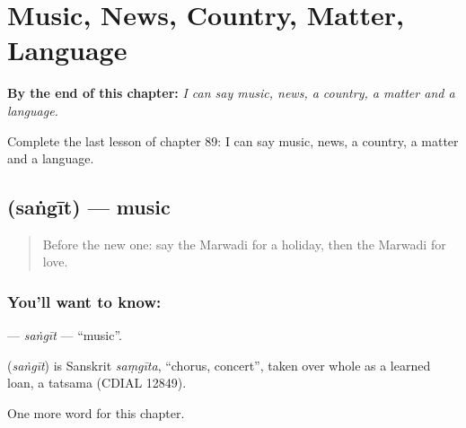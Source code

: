 
\chapter{Music, News, Country, Matter, Language}
\label{ch:mw-music-news-country-matter-language}

\begin{chapteropening}
\textbf{By the end of this chapter:} \emph{I can say music, news, a country, a matter and a language.}

Complete the last lesson of chapter 89: I can say music, news, a country, a matter and a language.
\end{chapteropening}

\section[\texorpdfstring{\mw{संगीत} (saṅgīt)}{संगीत (saṅgīt)}]{ (saṅgīt) — music}

\label{lesson:MW-C89-sangit}



\begin{quote}
Before the new one: say the Marwadi for a holiday, then the Marwadi for love.
\end{quote}

\subsection*{You'll want to know: }
\textbf{} — \emph{saṅgīt} — \textquotedblleft{}music\textquotedblright{}.

\begin{cousinweb}
\textbf{} (\emph{saṅgīt}) is Sanskrit \emph{saṃgīta}, \textquotedblleft{}chorus, concert\textquotedblright{}, taken over whole as a learned loan, a tatsama (CDIAL 12849).
\end{cousinweb}

\begin{grammarlens}[title={What you've built}]
One more word for this chapter.
\end{grammarlens}


